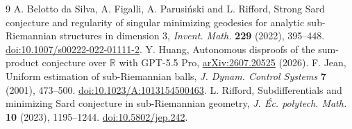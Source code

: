 \documentclass[11pt,letterpaper]{article}
\begin{document}
\begin{thebibliography}{9}
A. Belotto da Silva, A. Figalli, A. Parusi\'nski and L. Rifford,
Strong Sard conjecture and regularity of singular minimizing geodesics
for analytic sub-Riemannian structures in dimension 3,
\emph{Invent. Math.} \textbf{229} (2022), 395--448.
\href{https://doi.org/10.1007/s00222-022-01111-2}{doi:10.1007/s00222-022-01111-2}.
Y. Huang, Autonomous disproofs of the sum-product conjecture over
$\mathbb R$ with GPT-5.5 Pro, \href{https://arxiv.org/abs/2607.20525}{arXiv:2607.20525} (2026).
F. Jean, Uniform estimation of sub-Riemannian balls,
\emph{J. Dynam. Control Systems} \textbf{7} (2001), 473--500.
\href{https://doi.org/10.1023/A:1013154500463}{doi:10.1023/A:1013154500463}.
L. Rifford, Subdifferentials and minimizing Sard conjecture in sub-Riemannian
geometry, \emph{J. \'{E}c. polytech. Math.} \textbf{10} (2023), 1195--1244.
\href{https://doi.org/10.5802/jep.242}{doi:10.5802/jep.242}.
\end{thebibliography}
\end{document}
